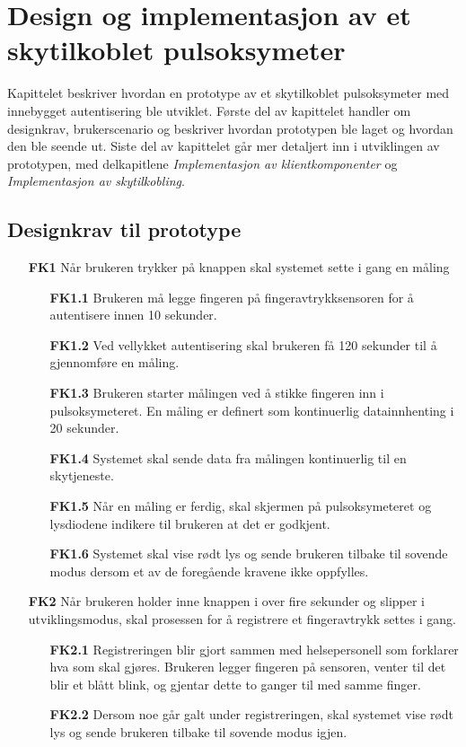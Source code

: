 \chapter{Design og implementasjon av et skytilkoblet pulsoksymeter}
\label{ch:implementation1}

Kapittelet beskriver hvordan en prototype av et skytilkoblet pulsoksymeter med innebygget autentisering ble utviklet.
Første del av kapittelet handler om designkrav, brukerscenario og beskriver hvordan prototypen ble laget
og hvordan den ble seende ut.
Siste del av kapittelet går mer detaljert inn i utviklingen av prototypen, med delkapitlene
\textit{Implementasjon av klientkomponenter} og \textit{Implementasjon av skytilkobling}.

\section{Designkrav til prototype}
\begin{enumerate}
    \item [\textbf{FK1}] Når brukeren trykker på knappen skal systemet sette i gang en måling
        \begin{enumerate}
          \item [\textbf{FK1.1}] Brukeren må legge fingeren på fingeravtrykksensoren for å autentisere innen 10 sekunder.
          \item [\textbf{FK1.2}] Ved vellykket autentisering skal brukeren få 120 sekunder til å gjennomføre
              en måling.
          \item [\textbf{FK1.3}] Brukeren starter målingen ved å stikke fingeren inn i pulsoksymeteret.
              En måling er definert som kontinuerlig datainnhenting i 20 sekunder.
          \item [\textbf{FK1.4}] Systemet skal sende data fra målingen kontinuerlig til en skytjeneste.
          \item [\textbf{FK1.5}] Når en måling er ferdig, skal skjermen på pulsoksymeteret og lysdiodene indikere til brukeren
              at det er godkjent.
          \item [\textbf{FK1.6}]Systemet skal vise rødt lys og sende brukeren tilbake til sovende modus dersom et av de
              foregående kravene ikke oppfylles.
        \end{enumerate}
    \item [\textbf{FK2}] Når brukeren holder inne knappen i over fire sekunder og slipper i utviklingsmodus,
        skal prosessen for å registrere et fingeravtrykk settes i gang.
        \begin{enumerate}
          \item [\textbf{FK2.1}] Registreringen blir gjort sammen med helsepersonell som forklarer hva som skal gjøres. Brukeren legger
              fingeren på sensoren, venter til det blir et blått blink, og gjentar dette to ganger til med samme finger.
          \item [\textbf{FK2.2}] Dersom noe går galt under registreringen, skal systemet vise rødt lys og sende brukeren
              tilbake til sovende modus igjen.
        \end{enumerate}
\end{enumerate}

